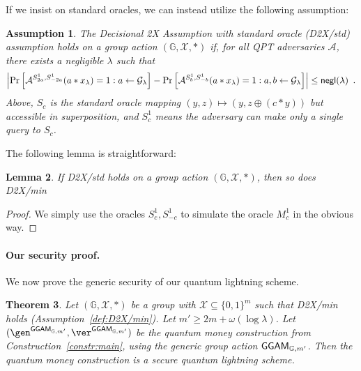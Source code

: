 \documentclass{article}\usepackage[a4paper,margin=20mm]{geometry}
\newtheorem{theorem}{Theorem}\newtheorem{lemma}[theorem]{Lemma}\newtheorem{proposition}[theorem]{Proposition}\newtheorem{corollary}[theorem]{Corollary}\newtheorem{definition}[theorem]{Definition}\newtheorem{claim}[theorem]{Claim}\newtheorem{remark}[theorem]{Remark}\newtheorem{observation}[theorem]{Observation}\newtheorem{conjecture}[theorem]{Conjecture}\newtheorem{example}[theorem]{Example}
\newtheorem{assumption}[theorem]{Assumption}
\numberwithin{theorem}{section}
\numberwithin{equation}{section}
\newcommand{\G}{\mathbb{G}}
\newcommand{\As}{{\mathcal{A}}}
\newcommand{\Gs}{{\mathcal{G}}}
\newcommand{\Xs}{{\mathcal{X}}}
\newcommand{\negl}{{\sf negl}}
\newcommand{\GGAM}{{\sf GGAM}}
\begin{document}
\noindent If we insist on standard oracles, we can instead utilize the following assumption:
\begin{assumption}\label{def:D2X/std} The Decisional 2X Assumption with standard oracle (D2X/std) assumption holds on a group action $(\G,\Xs,*)$ if, for all QPT adversaries $\As$, there exists a negligible $\lambda$ such that 
	\[\left|\Pr\left[\As^{S_{2a}^1,S_{-2a}^1}(a*x_\lambda)=1: a\gets\Gs_\lambda\right]-\Pr\left[\As^{S_b^1,S_{-b}^1}(a*x_\lambda)=1: a,b\gets\Gs_\lambda\right]\right|\leq\negl(\lambda)\enspace .\]
	Above, $S_{c}$ is the standard oracle mapping $(y,z)\mapsto (y,z\oplus (c*y))$ but accessible in superposition, and $S_{c}^1$ means the adversary can make only a single query to $S_c$.
\end{assumption}
\noindent The following lemma is straightforward:
\begin{lemma}\label{lem:standard2min2dx} If D2X/std holds on a group action $(\G,\Xs,*)$, then so does D2X/min
\end{lemma}
\begin{proof}We simply use the oracles $S_c^1,S_{-c}^1$ to simulate the oracle $M_c^1$ in the obvious way.
\end{proof}


\paragraph{Our security proof.} We now prove the generic security of our quantum lightning scheme.


\begin{theorem}\label{thm:main} Let $(\G,\Xs,*)$ be a group with $\Xs\subseteq\{0,1\}^m$ such that D2X/min holds (Assumption~\ref{def:D2X/min}). Let $m'\geq 2m+\omega(\log\lambda)$. Let $(\gen^{\GGAM_{\G,m'}},\ver^{\GGAM_{\G,m'}})$ be the quantum money construction from Construction~\ref{constr:main}, using the generic group action $\GGAM_{\G,m'}$. Then the quantum money construction is a secure quantum lightning scheme.\end{theorem}
\end{document}
